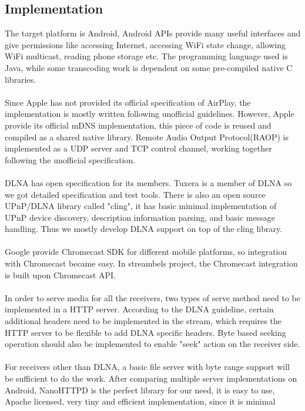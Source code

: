 \subsection{Implementation}
The target platform is Android, Android APIs provide many useful interfaces and
give permissions like accessing Internet, accessing WiFi state change, allowing
WiFi multicast, reading phone storage etc. The programming language used is
Java, while some transcoding work is dependent on some pre-compiled native C
libraries.\\
\\
Since Apple has not provided its official specification of AirPlay, the
implementation is mostly written following unofficial guidelines. However, Apple
provide its official mDNS implementation, this piece of code is reused and
compiled as a shared native library. Remote Audio Output Protocol(RAOP) is
implemented as a UDP server and TCP control channel, working together following
the unofficial specification.\\
\\
DLNA has open specification for its members. Tuxera is a member of DLNA so we
got detailed specification and test tools. There is also an open source UPnP/DLNA
library called "cling"\cite{cling}, it has basic minimal implementation of UPnP
device discovery, description information parsing, and basic message handling.
Thus we mostly develop DLNA support on top of the cling library.\\
\\
Google provide Chromecast SDK for different mobile platforms, so integration
with Chromecast became easy. In streambels project, the Chromecast integration
is built upon Chromecast API.\\
\\
In order to serve media for all the receivers, two types of serve method need to
be implemented in a HTTP server. According to the DLNA guideline, certain
additional headers need to be implemented in the stream, which requires the HTTP
server to be flexible to add DLNA specific headers.  Byte based seeking
operation should also be implemented to enable "seek" action on the receiver
side.\\
\\
For receivers other than DLNA, a basic file server with byte range support will
be sufficient to do the work. After comparing multiple server implementations
on Android, NanoHTTPD is the perfect library for our need, it is easy to use,
Apache licensed, very tiny and efficient implementation, since it is minimal
